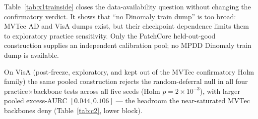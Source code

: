 \documentclass[preprint,11pt]{elsarticle}
\begin{document}
Table~\ref{tab:x1trainside} closes the data-availability question without changing the
confirmatory verdict. It shows that ``no Dinomaly train dump'' is too broad: MVTec AD and VisA
dumps exist, but their checkpoint dependence limits them to exploratory practice sensitivity.
Only the PatchCore held-out-good construction supplies an independent calibration pool; no MPDD
Dinomaly train dump is available.

On VisA (post-freeze, exploratory, and kept out of the MVTec confirmatory Holm family) the same
pooled construction rejects the random-deferral null in all four practice$\times$backbone tests
across all five seeds (Holm $p=2\times10^{-3}$), with larger pooled excess-AURC $[0.044,0.106]$ ---
the headroom the near-saturated MVTec backbones deny (Table~\ref{tab:c2}, lower block).
\end{document}
